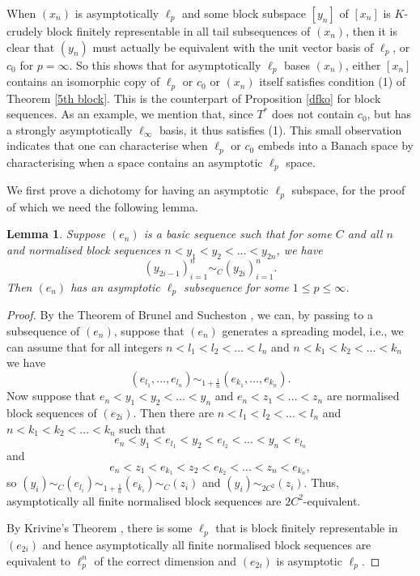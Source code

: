 \documentclass[10pt]{amsart}
\numberwithin{equation}{section}
\newtheorem{lemme}[thm]{Lemma}
\begin{document}
When $(x_n)$ is asymptotically $\ell_p$ and some block subspace $[y_n]$ of
$[x_n]$ is $K$-crudely  block finitely representable in all tail subsequences
of $(x_n)$, then it is clear that  $(y_n)$ must actually be equivalent with the
unit vector basis of $\ell_p$, or $c_0$ for $p=\infty$. So this shows that for
asymptotically $\ell_p$ bases $(x_n)$, either $[x_n]$ contains an isomorphic
copy of $\ell_p$ or $c_0$ or $(x_n)$ itself satisfies  condition (1) of Theorem
\ref{5th block}. This is the counterpart of Proposition \ref{dfko} for block
sequences. As an example, we mention that, since $T^*$ does not contain $c_0$,
but has a strongly asymptotically $\ell_\infty$ basis, it thus satisfies (1).
This small observation indicates that one can characterise when $\ell_p$ or
$c_0$ embeds into a Banach space by characterising when a space contains an
asymptotic $\ell_p$ space.

We first prove a dichotomy for having an asymptotic $\ell_p$ subspace, for the
proof of which we need the following lemma.

\begin{lemme}\label{krivine}
Suppose $(e_n)$ is a basic sequence such that for some $C$ and all $n$ and
normalised block sequences  $n<y_1<y_2<\ldots<y_{2n}$, we have
$$
(y_{2i-1})_{i=1}^n\sim_C(y_{2i})_{i=1}^n.
$$
Then $(e_n)$ has an asymptotic $\ell_p$ subsequence for some $1{\ensuremath{\leqslant}} p{\ensuremath{\leqslant}}
\infty$.
\end{lemme}

\begin{proof}
By the Theorem of Brunel and Sucheston \cite{brunel}, we can, by passing to a
subsequence of $(e_n)$, suppose that $(e_n)$ generates a spreading model, i.e.,
we can assume that for all integers $n<l_1<l_2<\ldots<l_n$ and
$n<k_1<k_2<\ldots<k_n$ we have
$$
(e_{l_1},\ldots,e_{l_n})\sim_{1+\frac 1n}(e_{k_1},\ldots,e_{k_n}).
$$
Now suppose that $e_n<y_1<y_2<\ldots<y_{n}$ and $e_n<z_1<\ldots<z_n$ are
normalised block sequences of $(e_{2i})$. Then there are $n<l_1<l_2<\ldots<l_n$
and $n<k_1<k_2<\ldots<k_n$ such that
$$
e_n<y_1<e_{l_1}<y_2<e_{l_2}<\ldots<y_n<e_{l_n}
$$
and
$$
e_n<z_1<e_{k_1}<z_2<e_{k_2}<\ldots<z_n<e_{k_n},
$$
so $(y_i)\sim_C(e_{l_i})\sim_{1+\frac1n}(e_{k_i})\sim_C(z_i)$ and
$(y_i)\sim_{2C^2}(z_i)$. Thus, asymptotically all finite normalised block
sequences are $2C^2$-equivalent.

By Krivine's Theorem \cite{krivine}, there is some $\ell_p$ that is block
finitely representable in $(e_{2i})$ and hence asymptotically all finite
normalised block sequences are equivalent to $\ell_p^n$ of the correct
dimension and $(e_{2i})$ is asymptotic $\ell_p$.
\end{proof}
\end{document}
